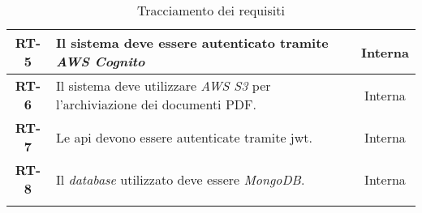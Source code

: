 \begin{longtable}{|c|>{\centering\arraybackslash}p{}|c|}
    \hline
    \textbf{RT-5} & Il sistema deve essere autenticato tramite \textit{AWS Cognito} & Interna \\
    \hline
    \textbf{RT-6} & Il sistema deve utilizzare \textit{AWS S3} per l’archiviazione dei documenti PDF. & Interna \\
    \hline
    \textbf{RT-7} & Le \gls{api} devono essere autenticate tramite \gls{jwt}. & Interna \\
    \hline
    \textbf{RT-8} & Il \textit{database} utilizzato deve essere \textit{MongoDB}. & Interna \\
    
    \hline
    \caption{Tracciamento dei requisiti} %
    \label{tab:requisiti-stage} %
\end{longtable}